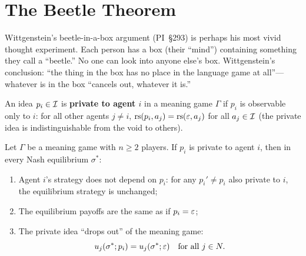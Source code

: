 \section{The Beetle Theorem}
\label{sec:beetle}

Wittgenstein's beetle-in-a-box argument (PI~\S293) is perhaps
his most vivid thought experiment.  Each person has a box
(their ``mind'') containing something they call a ``beetle.''
No one can look into anyone else's box.  Wittgenstein's
conclusion: ``the thing in the box has no place in the language
game at all''---whatever is in the box ``cancels out, whatever
it is.''

\begin{definition}
\label{def:private}
An idea $p_i \in \mathcal{I}$ is \textbf{private to agent $i$} in
a meaning game $\Gamma$ if $p_i$ is observable only to $i$:
for all other agents $j \ne i$,
$\mathrm{rs}(p_i, a_j) = \mathrm{rs}(\varepsilon, a_j)$ for all $a_j \in \mathcal{I}$
(the private idea is indistinguishable from the void to others).
\end{definition}

\begin{theorem}
\label{thm:beetle}
Let $\Gamma$ be a meaning game with $n \ge 2$ players.  If
$p_i$ is private to agent $i$, then in every Nash equilibrium
$\sigma^*$:
\begin{enumerate}[label=(\roman*)]
  \item Agent $i$'s strategy does not depend on $p_i$: for any
    $p_i' \ne p_i$ also private to $i$, the equilibrium strategy
    is unchanged;
  \item The equilibrium payoffs are the same as if $p_i = \varepsilon$;
  \item The private idea ``drops out'' of the meaning game:
    \[
      u_j(\sigma^*; p_i) = u_j(\sigma^*; \varepsilon)
      \quad \text{for all } j \in N.
    \]
\end{enumerate}
\end{theorem}

